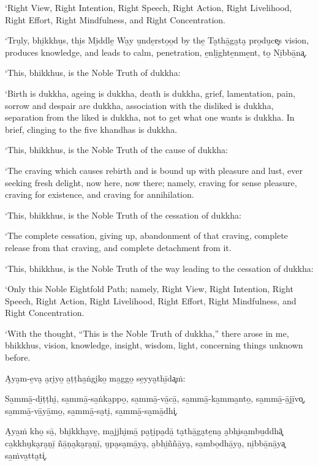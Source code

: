 ‘Right View, Right Intention, Right Speech, Right Action, Right
Livelihood, Right Effort, Right Mindfulness, and Right Concentration.

‘Tru̱ly, bhi̱kkhu̱s, thi̱s Mi̱ddle̱ Wa̱y u̱nde̱rsto̱o̱d by the̱ Ta̮thā̱ga̮ta̮ pro̱du̮ce͓s
vision, produces knowledge, and leads to calm, penetration,
e̱nli̱ghte̱nme̱nt, to̱ Ni̱bbā̱na͓.

‘This, bhikkhus, is the Noble Truth of dukkha:

‘Birth is dukkha, ageing is dukkha, death is dukkha, grief,
lamentation, pain, sorrow and despair are dukkha, association with the
disliked is dukkha, separation from the liked is dukkha, not to get what
one wants is dukkha. In brief, clinging to the five khandhas is dukkha.

‘This, bhikkhus, is the Noble Truth of the cause of dukkha:

‘The craving which causes rebirth and is bound up with pleasure and
lust, ever seeking fresh delight, now here, now there; namely, craving
for sense pleasure, craving for existence, and craving for annihilation.

‘This, bhikkhus, is the Noble Truth of the cessation of dukkha:

‘The complete cessation, giving up, abandonment of that craving,
complete release from that craving, and complete detachment from it.

‘This, bhikkhus, is the Noble Truth of the way leading to the cessation
of dukkha:

‘Only this Noble Eightfold Path; namely, Right View, Right Intention,
Right Speech, Right Action, Right Livelihood, Right Effort, Right
Mindfulness, and Right Concentration.

‘With the thought, “This is the Noble Truth of dukkha,” there arose in
me, bhikkhus, vision, knowledge, insight, wisdom, light, concerning
things unknown before.

\clearpage

\paliText
\markboth{\paliTitle}{\rightmark}

A̮ya̮m-e̱va̮ a̮ri̮yo̱ a̱ṭṭha̱ṅgi̮ko̱ ma̱ggo̱ se̱yya̮thī̱da͓ṁ:

Sa̱mmā̱-di̱ṭṭhi̮, sa̱mmā̱-sa̱ṅka̱ppo̱, sa̱mmā̱-vā̱cā̱, sa̱mmā̱-ka̱mma̱nto̱, sa̱mmā̱-ā̱jī̱vo͓,
sa̱mmā̱-vā̱yā̱mo̱, sa̱mmā̱-sa̮ti̮, sa̱mmā̱-sa̮mā̱dhi͓.

A̮ya̱ṁ kho̱ sā̱, bhi̱kkha̮ve̱, ma̱jjhi̮mā̱ pa̮ṭi̮pa̮dā̱ ta̮thā̱ga̮te̱na̮ a̮bhi̮sa̱mbu̱ddhā͓
ca̱kkhu̮ka̮ra̮ṇī̱ ñā̱ṇa̮ka̮ra̮ṇī̱, u̮pa̮sa̮mā̱ya̮, a̮bhi̱ññā̱ya̮, sa̱mbo̱dhā̱ya̮, ni̱bbā̱nā̱ya͓
sa̱ṁva̱tta̮ti͓.

